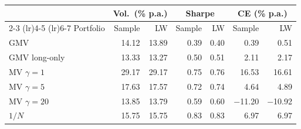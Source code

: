 \begin{tabular}{lrrrrrr}
\toprule
 & \multicolumn{2}{c}{Vol.\ (\% p.a.)} & \multicolumn{2}{c}{Sharpe} & \multicolumn{2}{c}{CE (\% p.a.)} \\
\cmidrule(lr){2-3} \cmidrule(lr){4-5} \cmidrule(lr){6-7}
Portfolio & Sample & LW & Sample & LW & Sample & LW \\
\midrule
GMV & 14.12 & 13.89 & 0.39 & 0.40 & 0.39 & 0.51 \\
GMV long-only & 13.33 & 13.27 & 0.50 & 0.51 & 2.11 & 2.17 \\
MV $\gamma=1$ & 29.17 & 29.17 & 0.75 & 0.76 & 16.53 & 16.61 \\
MV $\gamma=5$ & 17.63 & 17.57 & 0.72 & 0.74 & 4.64 & 4.89 \\
MV $\gamma=20$ & 13.85 & 13.79 & 0.59 & 0.60 & $-$11.20 & $-$10.92 \\
$1/N$ & 15.75 & 15.75 & 0.83 & 0.83 & 6.97 & 6.97 \\
\bottomrule
\end{tabular}
